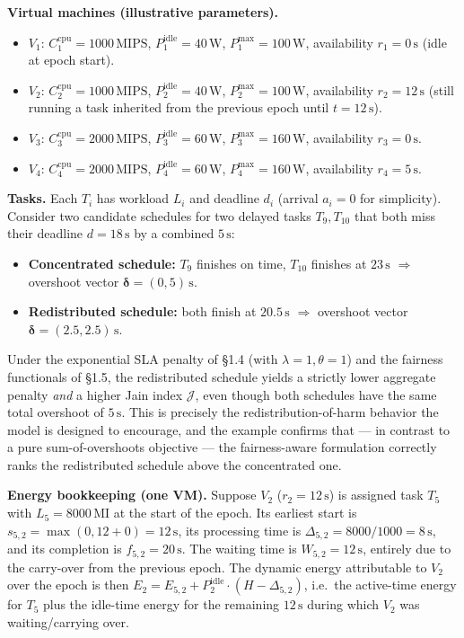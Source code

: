 \documentclass[11pt,a4paper]{article}
\begin{document}
\textbf{Virtual machines (illustrative parameters).}
\begin{itemize}[leftmargin=2em,itemsep=2pt]
  \item $V_1$: $C^{\text{cpu}}_1 = 1000\,\text{MIPS}$, $P^{\text{idle}}_1 = 40\,\text{W}$, $P^{\text{max}}_1 = 100\,\text{W}$, availability $r_1 = 0\,\text{s}$ (idle at epoch start).
  \item $V_2$: $C^{\text{cpu}}_2 = 1000\,\text{MIPS}$, $P^{\text{idle}}_2 = 40\,\text{W}$, $P^{\text{max}}_2 = 100\,\text{W}$, availability $r_2 = 12\,\text{s}$ (still running a task inherited from the previous epoch until $t = 12\,\text{s}$).
  \item $V_3$: $C^{\text{cpu}}_3 = 2000\,\text{MIPS}$, $P^{\text{idle}}_3 = 60\,\text{W}$, $P^{\text{max}}_3 = 160\,\text{W}$, availability $r_3 = 0\,\text{s}$.
  \item $V_4$: $C^{\text{cpu}}_4 = 2000\,\text{MIPS}$, $P^{\text{idle}}_4 = 60\,\text{W}$, $P^{\text{max}}_4 = 160\,\text{W}$, availability $r_4 = 5\,\text{s}$.
\end{itemize}

\textbf{Tasks.} Each $T_i$ has workload $L_i$ and deadline $d_i$ (arrival $a_i = 0$ for simplicity). Consider two candidate schedules for two delayed tasks $T_9, T_{10}$ that both miss their deadline $d = 18\,\text{s}$ by a combined $5\,\text{s}$:
\begin{itemize}[leftmargin=2em,itemsep=2pt]
  \item \textbf{Concentrated schedule:} $T_9$ finishes on time, $T_{10}$ finishes at $23\,\text{s}$ $\Rightarrow$ overshoot vector $\boldsymbol{\delta} = (0, 5)\,\text{s}$.
  \item \textbf{Redistributed schedule:} both finish at $20.5\,\text{s}$ $\Rightarrow$ overshoot vector $\boldsymbol{\delta} = (2.5, 2.5)\,\text{s}$.
\end{itemize}

Under the exponential SLA penalty of §1.4 (with $\lambda = 1, \theta = 1$) and the fairness functionals of §1.5, the redistributed schedule yields a strictly lower aggregate penalty \emph{and} a higher Jain index $\mathcal{J}$, even though both schedules have the same total overshoot of $5\,\text{s}$. This is precisely the redistribution-of-harm behavior the model is designed to encourage, and the example confirms that --- in contrast to a pure sum-of-overshoots objective --- the fairness-aware formulation correctly ranks the redistributed schedule above the concentrated one.

\textbf{Energy bookkeeping (one VM).} Suppose $V_2$ ($r_2 = 12\,\text{s}$) is assigned task $T_5$ with $L_5 = 8000\,\text{MI}$ at the start of the epoch. Its earliest start is $s_{5,2} = \max(0, 12 + 0) = 12\,\text{s}$, its processing time is $\Delta_{5,2} = 8000 / 1000 = 8\,\text{s}$, and its completion is $f_{5,2} = 20\,\text{s}$. The waiting time is $W_{5,2} = 12\,\text{s}$, entirely due to the carry-over from the previous epoch. The dynamic energy attributable to $V_2$ over the epoch is then $E_2 = E_{5,2} + P^{\text{idle}}_2 \cdot (H - \Delta_{5,2})$, i.e.\ the active-time energy for $T_5$ plus the idle-time energy for the remaining $12\,\text{s}$ during which $V_2$ was waiting/carrying over.
\end{document}
